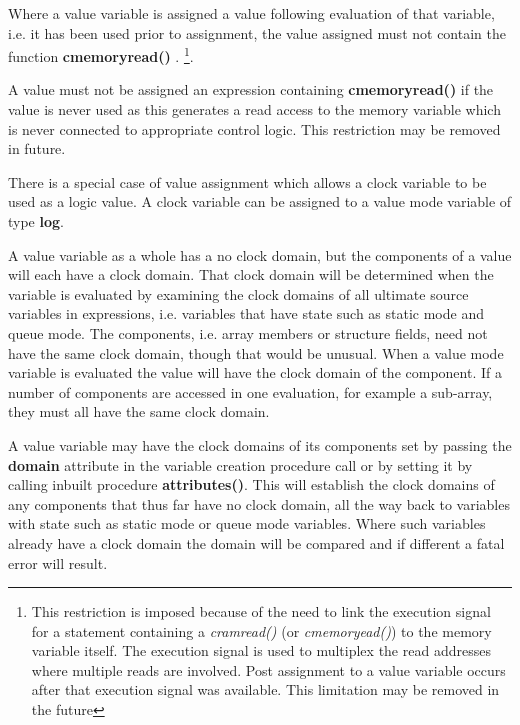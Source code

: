         Where a value variable is assigned a value following evaluation of that
        variable, i.e. it has been used prior to assignment, the value assigned
        must not contain the function {\bf cmemoryread()}
        . \footnote{This restriction is imposed
        because of the need to link the execution signal for a statement
        containing a {\em cramread()} (or {\em cmemoryead()}) to the memory
        variable itself. The execution signal is used to multiplex the read
        addresses where multiple reads are involved. Post assignment to a value
        variable occurs after that execution signal was available. This
        limitation may be removed in the future}.
        
        A value must not be assigned an expression containing {\bf
        cmemoryread()}  if the value is never used
        as this generates a read access to the memory variable which is never
        connected to appropriate control logic. This restriction may be removed
        in future.
        
        There is a special case of value assignment which allows a clock variable
        to be used as a logic value. A clock variable can be assigned to a value
        mode variable of type {\bf log}.
        
        A value variable as a whole has a no clock domain, but the components of a
        value will each have a clock domain. That clock domain will be determined
        when the variable is evaluated by examining the clock domains of all
        ultimate source variables in expressions, i.e. variables that have state
        such as static mode and queue mode. The components, i.e. array members or
        structure fields, need not have the same clock domain, though that would
        be unusual. When a value mode variable is evaluated the value will have
        the clock domain of the component. If a number of components are accessed
        in one evaluation, for example a sub-array, they must all have the same
        clock domain.
        
        A value variable may have the clock domains of its components set by
        passing the {\bf domain} attribute in the variable creation procedure call
        or by setting it by calling inbuilt procedure {\bf attributes()}. This will
        establish the clock domains of any components that thus far have no
        clock domain, all the way back to variables with state such as static mode
        or queue mode variables. Where such variables already have a clock domain
        the domain will be compared and if different a fatal error will result.
        
